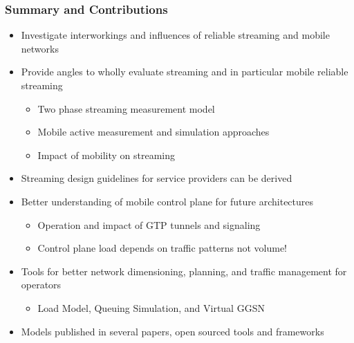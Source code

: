 \documentclass{beamer}
\begin{document}
\begin{frame}
	\frametitle{Summary and Contributions}

	\begin{itemize}
		\item Investigate interworkings and influences of reliable streaming and mobile networks
		\item Provide angles to wholly evaluate streaming and in particular mobile reliable streaming
		\begin{itemize}
			\item Two phase streaming measurement model
			\item Mobile active measurement and simulation approaches
			\item Impact of mobility on streaming
		\end{itemize}
		\item Streaming design guidelines for service providers can be derived
		\vspace{1em}
		\item Better understanding of mobile control plane for future architectures
			\begin{itemize}
				\item Operation and impact of GTP tunnels and signaling
				\item Control plane load depends on traffic patterns not volume!
			\end{itemize}
		\item Tools for better network dimensioning, planning, and traffic management for operators
			\begin{itemize}
				\item Load Model, Queuing Simulation, and Virtual GGSN
			\end{itemize}
		\item Models published in several papers, open sourced tools and frameworks
	\end{itemize}
\end{frame}
\end{document}
